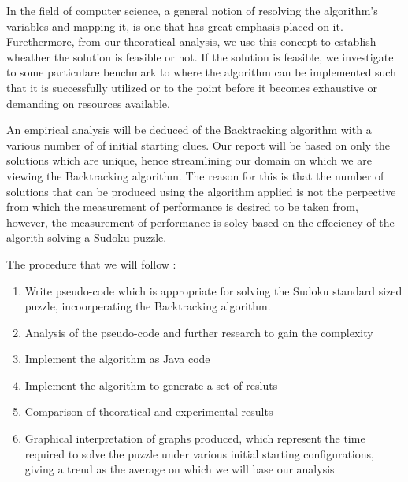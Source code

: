 \documentclass[12pt]{article}
\begin{document}
\begin{flushleft}
In the field of computer science, a general notion of resolving the algorithm's variables and mapping it, is one that has great emphasis placed on it. Furethermore, from our theoratical analysis, we use this concept to establish wheather the solution is feasible or not. If the solution is feasible, we investigate to some particulare benchmark to where the algorithm can be implemented such that it is successfully utilized or to the point before it becomes exhaustive or demanding on resources available. 
\end{flushleft}

\begin{flushleft}
An empirical analysis will be deduced of the Backtracking algorithm with a various number of of initial starting clues. Our report will be based on only the solutions which are unique, hence streamlining our domain on which we are viewing the Backtracking algorithm. The reason for this is that the number of solutions that can be produced using the algorithm applied is not the perpective from which the measurement of performance is desired to be taken from, however, the measurement of performance is soley based on the effeciency of the algorith solving a Sudoku puzzle. 
\end{flushleft}

\begin{flushleft}
The procedure that we will follow : 
\begin{enumerate}
\item Write pseudo-code which is appropriate for solving the Sudoku standard sized puzzle, incoorperating the Backtracking algorithm.
\item Analysis of the pseudo-code and further research to gain the complexity
\item Implement the algorithm as Java code 
\item Implement the algorithm to generate a set of resluts
\item Comparison of theoratical and experimental results
\item Graphical interpretation of graphs produced, which represent the time required to solve the puzzle under various initial starting configurations, giving a trend as the average on which we will base our analysis 
\end{enumerate}
\end{flushleft}
\end{document}
